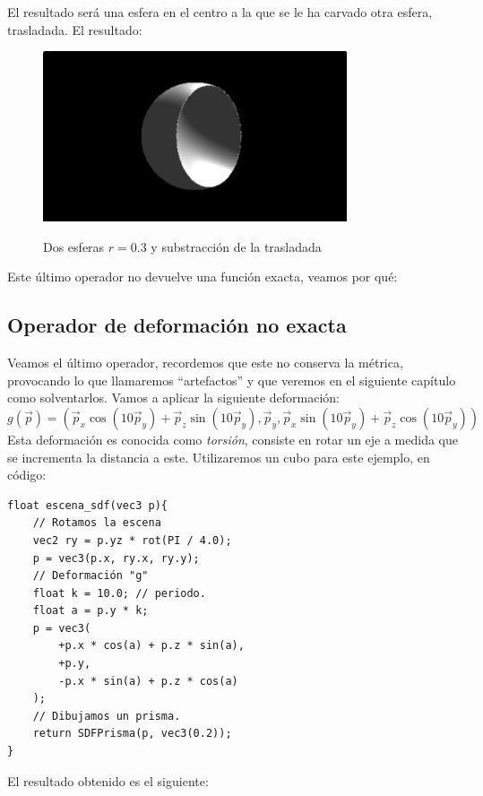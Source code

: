 El resultado será una esfera en el centro a la que se le ha carvado otra esfera, trasladada. El resultado:

\begin{figure}[H]
  \centering
  \captionsetup{justification=centering}%
  \includegraphics[width=0.8\textwidth]{secciones/imagenes/sdf_substract_3d.jpeg}\label{fig:sub3d}
  \caption{Dos esferas \(r=0.3\) y substracción de la trasladada}
\end{figure}

Este último operador no devuelve una función exacta, veamos por qué:

\subsection{Operador de deformación no exacta}

Veamos el último operador, recordemos que este no conserva la métrica, provocando lo que llamaremos \enquote{artefactos} y que veremos en el siguiente capítulo como solventarlos. Vamos a aplicar la siguiente deformación:
\[g(\Vec{p})=(
\Vec{p}_x \cos(10\Vec{p}_y) + \Vec{p}_z\sin(10\Vec{p}_y),
\Vec{p}_y,
\Vec{p}_x\sin(10\Vec{p}_y) + \Vec{p}_z\cos(10\Vec{p}_y)
)
\]
Esta deformación es conocida como \textit{torsión}, consiste en rotar un eje a medida que se incrementa la distancia a este. Utilizaremos un cubo para este ejemplo, en código:

\begin{lstlisting}
float escena_sdf(vec3 p){
    // Rotamos la escena
    vec2 ry = p.yz * rot(PI / 4.0);
    p = vec3(p.x, ry.x, ry.y);
    // Deformación "g"
    float k = 10.0; // periodo.
    float a = p.y * k;
    p = vec3(
    	+p.x * cos(a) + p.z * sin(a),
    	+p.y,
        -p.x * sin(a) + p.z * cos(a)
    );
	// Dibujamos un prisma.
    return SDFPrisma(p, vec3(0.2));
}
\end{lstlisting}

El resultado obtenido es el siguiente:

